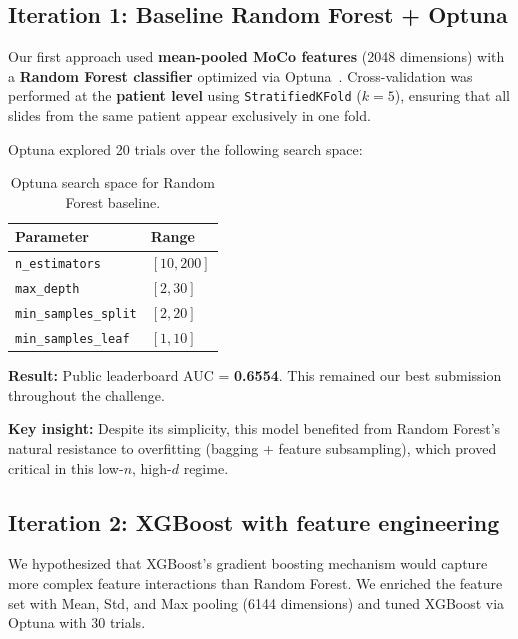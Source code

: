 \documentclass[11pt,a4paper]{article}
\begin{document}
\subsection{Iteration 1: Baseline Random Forest + Optuna}
\label{sec:rf_baseline}

Our first approach used \textbf{mean-pooled MoCo features} (2048 dimensions) with a \textbf{Random Forest classifier} optimized via Optuna~\citep{akiba2019optuna}. Cross-validation was performed at the \textbf{patient level} using \texttt{StratifiedKFold} ($k=5$), ensuring that all slides from the same patient appear exclusively in one fold.

Optuna explored 20 trials over the following search space:

\begin{table}[H]
    \centering
    \caption{Optuna search space for Random Forest baseline.}
    \begin{tabular}{ll}
        \toprule
        \textbf{Parameter} & \textbf{Range} \\
        \midrule
        \texttt{n\_estimators}     & $[10, 200]$  \\
        \texttt{max\_depth}        & $[2, 30]$    \\
        \texttt{min\_samples\_split} & $[2, 20]$  \\
        \texttt{min\_samples\_leaf}  & $[1, 10]$  \\
        \bottomrule
    \end{tabular}
    \label{tab:optuna_rf}
\end{table}

\textbf{Result:} Public leaderboard AUC = \textbf{0.6554}. This remained our best submission throughout the challenge.

\textbf{Key insight:} Despite its simplicity, this model benefited from Random Forest's natural resistance to overfitting (bagging + feature subsampling), which proved critical in this low-$n$, high-$d$ regime.

\subsection{Iteration 2: XGBoost with feature engineering}

We hypothesized that XGBoost's gradient boosting mechanism would capture more complex feature interactions than Random Forest. We enriched the feature set with Mean, Std, and Max pooling (6144 dimensions) and tuned XGBoost via Optuna with 30 trials.
\end{document}
